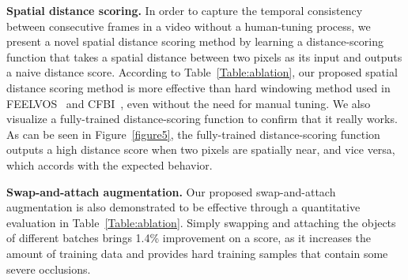 \documentclass[runningheads]{llncs}
\begin{document}
\noindent\textbf{Spatial distance scoring.} In order to capture the temporal consistency between consecutive frames in a video without a human-tuning process, we present a novel spatial distance scoring method by learning a distance-scoring function that takes a spatial distance between two pixels as its input and outputs a naive distance score. According to Table~\ref{Table:ablation}, our proposed spatial distance scoring method is more effective than hard windowing method used in FEELVOS~\cite{FEELVOS} and CFBI~\cite{CFBI}, even without the need for manual tuning. We also visualize a fully-trained distance-scoring function to confirm that it really works. As can be seen in Figure~\ref{figure5}, the fully-trained distance-scoring function outputs a high distance score when two pixels are spatially near, and vice versa, which accords with the expected behavior.



\noindent\textbf{Swap-and-attach augmentation.} Our proposed swap-and-attach augmentation is also demonstrated to be effective through a quantitative evaluation in Table~\ref{Table:ablation}. Simply swapping and attaching the objects of different batches brings 1.4\% improvement on a  score, as it increases the amount of training data and provides hard training samples that contain some severe occlusions.
\end{document}
